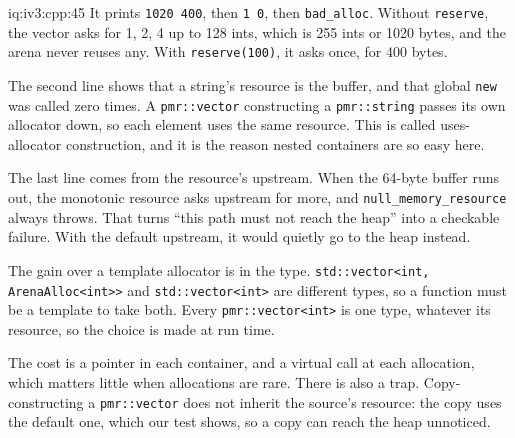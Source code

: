 \begin{solution}{iq:iv3:cpp:45}
It prints \texttt{1020 400}, then \texttt{1 0}, then \texttt{bad\_alloc}. Without \texttt{reserve}, the vector asks for 1, 2, 4 up to 128 ints, which is 255 ints or 1020 bytes, and the arena never reuses any. With \texttt{reserve(100)}, it asks once, for 400 bytes.

The second line shows that a string's resource is the buffer, and that global \texttt{new} was called zero times. A \texttt{pmr::vector} constructing a \texttt{pmr::string} passes its own allocator down, so each element uses the same resource. This is called uses-allocator construction, and it is the reason nested containers are so easy here.

The last line comes from the resource's upstream. When the 64-byte buffer runs out, the monotonic resource asks upstream for more, and \texttt{null\_memory\_resource} always throws. That turns ``this path must not reach the heap'' into a checkable failure. With the default upstream, it would quietly go to the heap instead.

The gain over a template allocator is in the type. \texttt{std::vector<int, ArenaAlloc<int>{}>} and \texttt{std::vector<int>} are different types, so a function must be a template to take both. Every \texttt{pmr::vector<int>} is one type, whatever its resource, so the choice is made at run time.

The cost is a pointer in each container, and a virtual call at each allocation, which matters little when allocations are rare. There is also a trap. Copy-constructing a \texttt{pmr::vector} does not inherit the source's resource: the copy uses the default one, which our test shows, so a copy can reach the heap unnoticed.

\end{solution}

